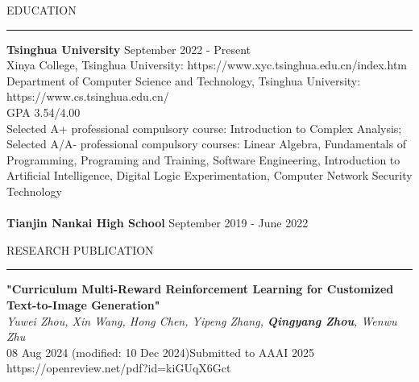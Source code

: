 \documentclass{resume} %
\renewenvironment{rSection}[1]{
\sectionskip
\textcolor{TsinghuaPurple}{\MakeUppercase{#1}}
\sectionlineskip
\hrule
\begin{list}{}{
\setlength{\leftmargin}{0em}
}
\item[]
}{
\end{list}
}
\begin{document}
  


\begin{rSection}{Education}

{\bf Tsinghua University} \hfill
{September 2022 - Present}\\ 
Xinya College, Tsinghua University: https://www.xyc.tsinghua.edu.cn/index.htm
\\
Department of Computer Science and Technology, Tsinghua University: https://www.cs.tsinghua.edu.cn/
\\
GPA 3.54/4.00
\\
Selected A+ professional compulsory course: Introduction to Complex Analysis; \\
Selected A/A- professional compulsory courses: Linear Algebra, Fundamentals of Programming, Programing and Training, Software Engineering, 	Introduction to Artificial Intelligence, Digital Logic Experimentation, Computer Network Security Technology\\
\\
{\bf Tianjin Nankai High School} \hfill
{September 2019 - June 2022}


\end{rSection} 

\begin{rSection}{ Research Publication } \itemsep -3pt        
{\textbf{"Curriculum Multi-Reward Reinforcement Learning for Customized Text-to-Image Generation"}\\
 \textit{Yuwei Zhou, Xin Wang, Hong Chen, Yipeng Zhang, \textbf{Qingyang Zhou}, Wenwu Zhu }\\
 08 Aug 2024 (modified: 10 Dec 2024)Submitted to AAAI 2025}\\
 https://openreview.net/pdf?id=kiGUqX6Gct\\
 
\end{rSection}
\end{document}
